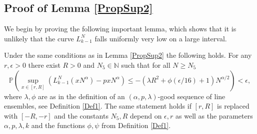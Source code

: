 \subsection{Proof of Lemma \ref{PropSup2}}\label{Section5.2}
We begin by proving the following important lemma, which shows that it is unlikely that the curve $L_{k-1}^N$ falls uniformly very low on a large interval.
\begin{lemma}\label{21}
	Under the same conditions as in Lemma \ref{PropSup2} the following holds. For any $r,\epsilon>0$ there exist $R>0$ and $N_5 \in \mathbb{N}$ such that for all $N\geq N_5$
	\begin{equation}\label{E21}
		\mathbb{P}\left(\sup_{x\in[r,R]} \left(L_{k-1}^N(xN^\alpha) - pxN^\alpha\right) \leq -(\lambda R^2 + \phi(\epsilon/16) + 1)N^{\alpha/2}\right) < \epsilon,
	\end{equation}
	where $\lambda, \phi$ are as in the definition of an $(\alpha,p,\lambda)$-good sequence of line ensembles, see Definition \ref{Def1}. The same statement holds if $[r,R]$ is replaced with $[-R,-r]$ and the constants $N_5, R$ depend on $\epsilon, r$ as well as the parameters $\alpha, p, \lambda, k$ and the functions $\phi, \psi$ from Definition \ref{Def1}. 
\end{lemma}
